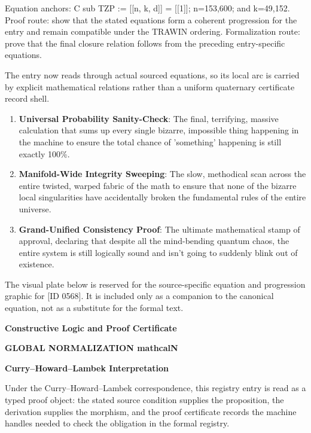 Equation anchors: C sub TZP := [[n, k, d]] = [[1]]; n=153,600; and k=49,152. Proof route: show that the stated equations form a coherent progression for the entry and remain compatible under the TRAWIN ordering. Formalization route: prove that the final closure relation follows from the preceding entry-specific equations.

The entry now reads through actual sourced equations, so its local arc is carried by explicit mathematical relations rather than a uniform quaternary certificate record shell.
\endgroup

\begin{enumerate}[leftmargin=1.6em,itemsep=6pt,topsep=4pt]
\item \textbf{Universal Probability Sanity-Check}: The final, terrifying, massive calculation that sums up every single bizarre, impossible thing happening in the machine to ensure the total chance of 'something' happening is still exactly 100\%.
\item \textbf{Manifold-Wide Integrity Sweeping}: The slow, methodical scan across the entire twisted, warped fabric of the math to ensure that none of the bizarre local singularities have accidentally broken the fundamental rules of the entire universe.
\item \textbf{Grand-Unified Consistency Proof}: The ultimate mathematical stamp of approval, declaring that despite all the mind-bending quantum chaos, the entire system is still logically sound and isn't going to suddenly blink out of existence.
\end{enumerate}

\begingroup\footnotesize\sloppy
The visual plate below is reserved for the source-specific equation and progression graphic for [ID 0568]. It is included only as a companion to the canonical equation, not as a substitute for the formal text.
\par\endgroup
\ifTZPDarkEdition
{}
\fi

\clearpage
\begingroup\tzpsupportsetup
\noindent\textbf{\fontsize{10.8pt}{12.8pt}\selectfont [ID 0568] Constructive Logic and Proof Certificate}\par
\noindent\textbf{\fontsize{10pt}{12pt}\selectfont GLOBAL NORMALIZATION mathcalN}\par
\vspace{0.45em}
\begingroup
\footnotesize
\setlength{\parskip}{0.22em}
\setlength{\parindent}{0pt}
\noindent\textbf{Curry--Howard--Lambek Interpretation}\par
Under the Curry--Howard--Lambek correspondence, this registry entry is read as a typed proof
object: the stated source condition supplies the proposition, the derivation supplies the
morphism, and the proof certificate records the machine handles needed to check the obligation
in the formal registry.

